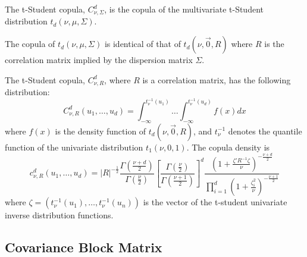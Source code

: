 \documentclass[11pt,fleqn]{book} %
\begin{document}
\begin{definition}
The t-Student copula, $C_{\nu,\Sigma}^d$, is the copula of the multivariate 
t-Student distribution $t_d(\nu,\mu,\Sigma)$.
\end{definition}

\begin{proposition}
The copula of $t_d(\nu,\mu,\Sigma)$ is identical of that of $t_d(\nu,\vec{0},R)$
where $R$ is the correlation matrix implied by the dispersion matrix $\Sigma$.
\end{proposition}

\begin{proposition}
The t-Student copula, $C_{\nu,R}^d$, where $R$ is a correlation matrix,
has the following distribution:
\begin{displaymath}
C_{\nu,R}^d(u_1, \dots, u_d) = 
\int_{-\infty}^{t_\nu^{-1}(u_1)} \dots \int_{-\infty}^{t_\nu^{-1}(u_d)} f(x) dx
\end{displaymath}
where $f(x)$ is the density function of $t_d(\nu,\vec{0},R)$, and $t_{\nu}^{-1}$ denotes the 
quantile function of the univariate distribution $t_1(\nu,0,1)$. 
The copula density is
\begin{displaymath}
\label{eq:density}
c_{\nu,R}^d(u_1,\dots,u_d) = %
|R|^{-\frac{1}{2}} 
\displaystyle\frac{\Gamma{\left(\frac{\nu+d}{2}\right)}}{\Gamma{\left(\frac{\nu}{2}\right)}}
\displaystyle\left[ \frac{\Gamma{\left(\frac{\nu}{2}\right)}}{\Gamma{\left(\frac{\nu+1}{2}\right)}} \right]^d
\frac{\displaystyle\left( 1+\frac{\zeta' R^{-1} \zeta}{\nu}\right)^{-\frac{\nu+d}{2}}}{\displaystyle\prod_{i=1}^d \left( 1+\frac{\zeta_i^2}{\nu} \right)^{-\frac{\nu+1}{2}}}
\end{displaymath}
\noindent
where $\zeta=(t_\nu^{-1}(u_1), \dots, t_\nu^{-1}(u_n))$ is the vector of the t-student 
univariate inverse distribution functions.
\end{proposition}


\subsection{Covariance Block Matrix}
\end{document}
